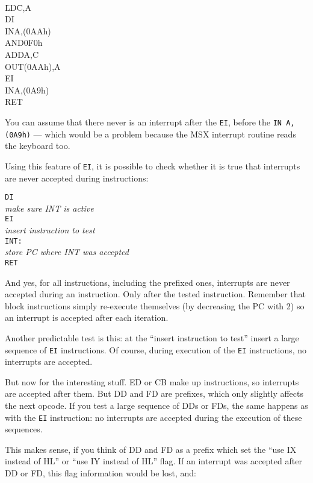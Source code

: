 \documentclass[oneside,a4paper]{book}
\begin{document}
{\tt
 \begin{tabbing}
   {\qquad}\=LD{\qquad}\=C,A\+\\
        DI\\
        IN\>A,(0AAh)\\
        AND\>0F0h\\
        ADD\>A,C\\
        OUT\>(0AAh),A\\
        EI\\
        IN\>A,(0A9h)\\
        RET
 \end{tabbing}
}


You can assume that there never is an interrupt after the {\tt EI}, before the
{\tt IN A,(0A9h)} --- which would be a problem because the MSX interrupt routine
reads the keyboard too.

Using this feature of {\tt EI}, it is possible to check whether it is true that
interrupts are never accepted during instructions:

\begin{tabbing}
  {\qquad}\={\tt DI}\+\\
  {\em make sure INT is active}\\
  {\tt EI}\\
  {\em insert instruction to test}\-\\
{\tt INT:}\+\\
  {\em store PC where INT was accepted}\\
  {\tt RET}
\end{tabbing}

And yes, for all instructions, including the prefixed ones, interrupts are
never accepted during an instruction. Only after the tested instruction. 
Remember that block instructions simply re-execute themselves (by decreasing
the PC with 2) so an interrupt is accepted after each iteration.

Another predictable test is this: at the ``insert instruction to test'' insert
a large sequence of {\tt EI} instructions. Of course, during execution of the 
{\tt EI} instructions, no interrupts are accepted. 

But now for the interesting stuff. ED or CB make up instructions,
so interrupts are accepted after them. But DD and FD are 
prefixes, which only slightly affects the next opcode. If you test a large
sequence of DDs or FDs, the same happens as with the {\tt EI} instruction: no
interrupts are accepted during the execution of these sequences.

This makes sense, if you think of DD and FD as a prefix which set the
``use IX instead of HL'' or ``use IY instead of HL'' flag. If an interrupt was
accepted after DD or FD, this flag information would be lost, and:
\end{document}
